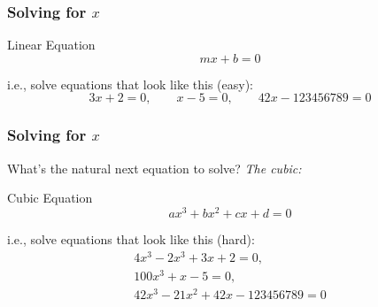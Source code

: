 \documentclass{beamer}
\begin{document}
\begin{frame}
\frametitle{Solving for $x$}
\begin{block}{Linear Equation}
\begin{equation}
    mx + b = 0
\end{equation}
\end{block}
i.e., solve equations that look like this (easy): 
\begin{equation*}
    3x + 2 = 0,\qquad
    x - 5 = 0,\qquad
    42 x - 123456789 =0 
\end{equation*}

\end{frame}


\begin{frame}
\frametitle{Solving for $x$}
What's the natural next equation to solve? \emph{The cubic:}
\begin{block}{Cubic Equation}
\begin{equation}
    ax^3 + bx^2+cx+d = 0
\end{equation}
\end{block}
i.e., solve equations that look like this (hard): 
\begin{eqnarray*}
    4x^3-2x^3+3x + 2 = 0,\\
    100x^3 + x - 5 = 0,\\
    42x^3 - 21x^2+42 x - 123456789 =0 
\end{eqnarray*}

\end{frame}

\end{document}
